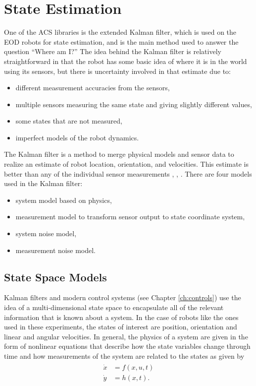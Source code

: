 \chapter{State Estimation}
\label{ch:estimation}
One of the ACS libraries is the extended Kalman filter, which is used on the EOD robots for state estimation, and is the main method used to answer the question ``Where am I?'' The idea behind the Kalman filter is relatively straightforward in that the robot has some basic idea of where it is in the world using its sensors, but there is uncertainty involved in that estimate due to:
\begin{itemize}
\item different measurement accuracies from the sensors,
\item multiple sensors measuring the same state and giving slightly different values,
\item some states that are not measured,
\item imperfect models of the robot dynamics.
\end{itemize}

The Kalman filter is a method to merge physical models and sensor data to realize an estimate of robot location, orientation, and velocities. This estimate is better than any of the individual sensor measurements \cite{Simon06OptimalEstimation}, \cite{Grewal08}, \cite{Orderud05}. There are four models used in the Kalman filter:
\begin{itemize}
\item system model based on physics,
\item measurement model to transform sensor output to state coordinate system,
\item system noise model,
\item measurement noise model.
\end{itemize}

\section{State Space Models}
\label{sec:statespacemodels}
Kalman filters and modern control systems (see Chapter \ref{ch:controls}) use the idea of a multi-dimensional state space to encapsulate all of the relevant information that is known about a system. In the case of robots like the ones used in these experiments, the states of interest are position, orientation and linear and angular velocities. In general, the physics of a system are given in the form of nonlinear equations that describe how the state variables change through time and how measurements of the system are related to the states as given by
\begin{align}
\label{eq:statespace}
\begin{split}
\dot{x} &= f(x,u,t) \\
\dot{y} &= h(x,t).
\end{split}
\end{align}

